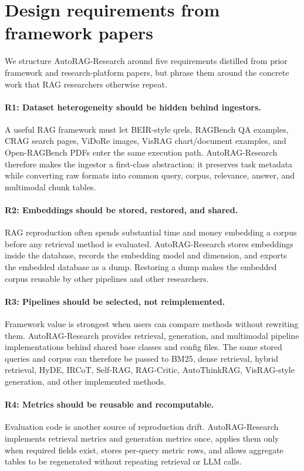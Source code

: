 \documentclass{article}
\newcommand{\framework}{AutoRAG-Research}
\begin{document}
\section{Design requirements from framework papers}

We structure \framework{} around five requirements distilled from prior framework and research-platform papers, but phrase them around the concrete work that RAG researchers otherwise repeat.

\paragraph{R1: Dataset heterogeneity should be hidden behind ingestors.}
A useful RAG framework must let BEIR-style qrels, RAGBench QA examples, CRAG search pages, ViDoRe images, VisRAG chart/document examples, and Open-RAGBench PDFs enter the same execution path. \framework{} therefore makes the ingestor a first-class abstraction: it preserves task metadata while converting raw formats into common query, corpus, relevance, answer, and multimodal chunk tables.

\paragraph{R2: Embeddings should be stored, restored, and shared.}
RAG reproduction often spends substantial time and money embedding a corpus before any retrieval method is evaluated. \framework{} stores embeddings inside the database, records the embedding model and dimension, and exports the embedded database as a dump. Restoring a dump makes the embedded corpus reusable by other pipelines and other researchers.

\paragraph{R3: Pipelines should be selected, not reimplemented.}
Framework value is strongest when users can compare methods without rewriting them. \framework{} provides retrieval, generation, and multimodal pipeline implementations behind shared base classes and config files. The same stored queries and corpus can therefore be passed to BM25, dense retrieval, hybrid retrieval, HyDE, IRCoT, Self-RAG, RAG-Critic, AutoThinkRAG, VisRAG-style generation, and other implemented methods.

\paragraph{R4: Metrics should be reusable and recomputable.}
Evaluation code is another source of reproduction drift. \framework{} implements retrieval metrics and generation metrics once, applies them only when required fields exist, stores per-query metric rows, and allows aggregate tables to be regenerated without repeating retrieval or LLM calls.
\end{document}

